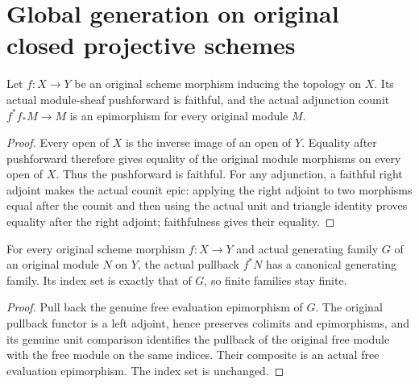 \section{Global generation on original closed projective schemes}

\begin{lemma}
\label{lem:actual-embedded-module-pushforward-faithful}
\leanok
Let $f:X\to Y$ be an original scheme morphism inducing the topology on $X$.
Its actual module-sheaf pushforward is faithful, and the actual adjunction
counit $f^*f_*M\to M$ is an epimorphism for every original module $M$.
\end{lemma}
\begin{proof}
Every open of $X$ is the inverse image of an open of $Y$. Equality after
pushforward therefore gives equality of the original module morphisms on
every open of $X$. Thus the pushforward is faithful. For any adjunction,
a faithful right adjoint makes the actual counit epic: applying the right
adjoint to two morphisms equal after the counit and then using the actual
unit and triangle identity proves equality after the right adjoint;
faithfulness gives their equality.
\end{proof}

\begin{lemma}
\label{lem:actual-module-pullback-quotient-generators}
\leanok
For every original scheme morphism $f:X\to Y$ and actual generating family
$G$ of an original module $N$ on $Y$, the actual pullback $f^*N$ has a
canonical generating family. Its index set is exactly that of $G$, so finite
families stay finite.
\end{lemma}
\begin{proof}
Pull back the genuine free evaluation epimorphism of $G$. The original
pullback functor is a left adjoint, hence preserves colimits and epimorphisms,
and its genuine unit comparison identifies the pullback of the original
free module with the free module on the same indices. Their composite is
an actual free evaluation epimorphism. The index set is unchanged.
\end{proof}

